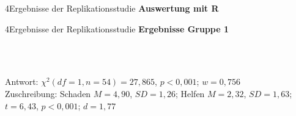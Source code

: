 \documentclass[xcolor=table,9pt,aspectratio=169]{beamer}
\begin{document}
\begin{frame}{\vspace*{10mm}4\hspace*{1em}Ergebnisse der Replikationsstudie}
\textbf{Auswertung mit R}\\
\smallskip
\lstset{style=mystyle}

\end{frame}


\begin{frame}{\vspace*{10mm}4\hspace*{1em}Ergebnisse der Replikationsstudie}
\textbf{Ergebnisse Gruppe 1}\\
\begin{multicols}{2}
   \begin{center}
      \\
      \\
   \end{center}
\end{multicols}
Antwort: $\chi^2(df=1,n=54)=27,865$, $p<0,001$; $w=0,756$\\
Zuschreibung: Schaden $M=4,90$, $SD=1,26$; Helfen $M=2,32$, $SD=1,63$; $t=6,43$, $p<0,001$; $d=1,77$
\end{frame}
\end{document}
